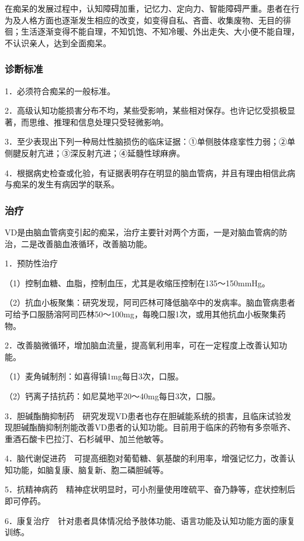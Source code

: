 在痴呆的发展过程中，认知障碍加重，记忆力、定向力、智能障碍严重。患者在行为及人格方面也逐渐发生相应的改变，如变得自私、吝啬、收集废物、无目的徘徊；生活逐渐变得不能自理，不知饥饱、不知冷暖、外出走失、大小便不能自理，不认识亲人，达到全面痴呆。

\subsubsection{诊断标准}

1．必须符合痴呆的一般标准。

2．高级认知功能损害分布不均，某些受影响，某些相对保存。也许记忆受损极显著，而思维、推理和信息处理只受轻微影响。

3．至少表现出下列一种局灶性脑损伤的临床证据：①单侧肢体痉挛性力弱；②单侧腱反射亢进；③深反射亢进；④延髓性球麻痹。

4．根据病史检查或化验，有证据表明存在明显的脑血管病，并且有理由相信此病与痴呆的发生有病因学的联系。

\subsubsection{治疗}

VD是由脑血管病变引起的痴呆，治疗主要针对两个方面，一是对脑血管病的防治，二是改善脑血液循环，改善脑功能。

1．预防性治疗

（1）控制血糖、血脂，控制血压，尤其是收缩压控制在135～150mmHg。

（2）抗血小板聚集：研究发现，阿司匹林可降低脑卒中的发病率。脑血管病患者可给予口服肠溶阿司匹林50～100mg，每晚口服1次，或用其他抗血小板聚集药物。

2．改善脑微循环，增加脑血流量，提高氧利用率，可在一定程度上改善认知功能。

（1）麦角碱制剂：如喜得镇1mg每日3次，口服。

（2）钙离子拮抗药：如尼莫地平20～40mg每日3次，口服。

3．胆碱酯酶抑制药　研究发现VD患者也存在胆碱能系统的损害，且临床试验发现胆碱酯酶抑制剂能改善VD患者的认知功能。目前用于临床的药物有多奈哌齐、重酒石酸卡巴拉汀、石杉碱甲、加兰他敏等。

4．脑代谢促进药　可提高细胞对葡萄糖、氨基酸的利用率，增强记忆力，改善认知功能，如脑复康、脑复新、胞二磷胆碱等。

5．抗精神病药　精神症状明显时，可小剂量使用喹硫平、奋乃静等，症状控制后即可停药。

6．康复治疗　针对患者具体情况给予肢体功能、语言功能及认知功能方面的康复训练。

